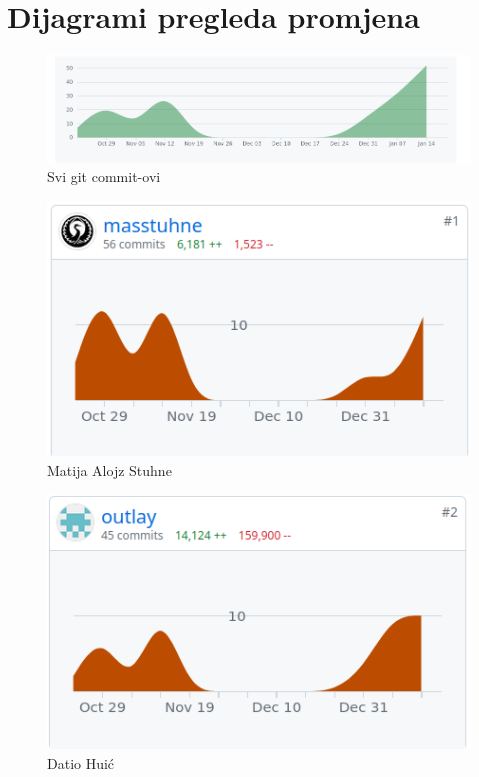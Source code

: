 		\section*{Dijagrami pregleda promjena}
		\begin{figure}[H]
			\includegraphics[scale=0.45]{slike/all_git.png} 
			\centering
			\caption{Svi git commit-ovi}
			\label{fig:all}
		\end{figure}
		\begin{figure}[H]
			\includegraphics[scale=0.45]{slike/masstuhne_git.png} 
			\centering
			\caption{Matija Alojz Stuhne}
			\label{fig:id5}
		\end{figure}
		\begin{figure}[H]
			\includegraphics[scale=0.45]{slike/outlay_git.png} 
			\centering
			\caption{Datio Huić}
			\label{fig:id1}
		\end{figure}
